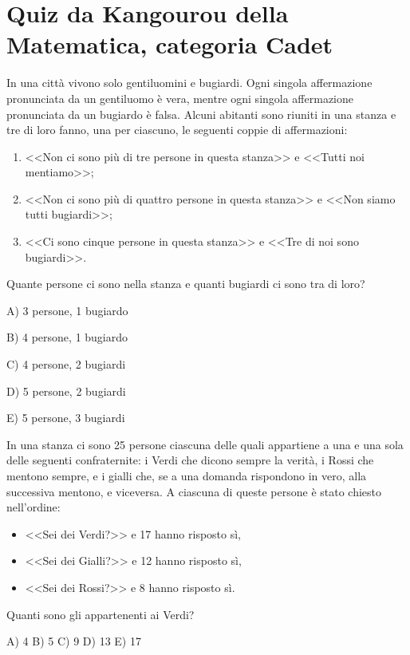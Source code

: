 \section{Quiz da Kangourou della Matematica, categoria Cadet}
\label{sec:quiz_kangourou_cadet}

\begin{esercizio}[Cadet 2010]
    \label{ex:cadet_2010}
    In una città vivono solo gentiluomini e bugiardi.
    Ogni singola affermazione pronunciata da un gentiluomo è vera,
    mentre ogni singola affermazione pronunciata da un bugiardo è falsa.
    Alcuni abitanti sono riuniti in una stanza e tre di loro fanno, una per ciascuno, le seguenti coppie di affermazioni:
    \begin{enumerate}
        \item <<Non ci sono più di tre persone in questa stanza>> e <<Tutti noi mentiamo>>;
        \item <<Non ci sono più di quattro persone in questa stanza>> e <<Non siamo tutti bugiardi>>;
        \item <<Ci sono cinque persone in questa stanza>> e <<Tre di noi sono bugiardi>>.
    \end{enumerate}
    Quante persone ci sono nella stanza e quanti bugiardi ci sono tra di loro?

    A) 3 persone, 1 bugiardo

    B) 4 persone, 1 bugiardo

    C) 4 persone, 2 bugiardi

    D) 5 persone, 2 bugiardi

    E) 5 persone, 3 bugiardi
\end{esercizio}

\begin{esercizio}[Cadet 2014]
    \label{ex:cadet_2014}
    In una stanza ci sono 25 persone ciascuna delle quali appartiene a una e una sola delle seguenti confraternite:
    i Verdi che dicono sempre la verità, i Rossi che mentono sempre, e i gialli che, se a una domanda rispondono in vero,
    alla successiva mentono, e viceversa.
    A ciascuna di queste persone è stato chiesto nell'ordine:
    \begin{itemize}
        \item <<Sei dei Verdi?>> e 17 hanno risposto sì,
        \item <<Sei dei Gialli?>> e 12 hanno risposto sì,
        \item <<Sei dei Rossi?>> e 8 hanno risposto sì.
    \end{itemize}
    Quanti sono gli appartenenti ai Verdi?

    A) 4 \quad B) 5 \quad C) 9 \quad D) 13 \quad E) 17
\end{esercizio}

